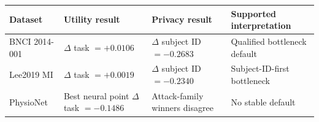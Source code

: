 \begin{tabular}{llll}
\toprule
Dataset & Utility result & Privacy result & Supported interpretation \\
\midrule
BNCI 2014-001 & $\Delta$ task $=+0.0106$ & $\Delta$ subject ID $=-0.2683$ & Qualified bottleneck default \\
Lee2019 MI & $\Delta$ task $=+0.0019$ & $\Delta$ subject ID $=-0.2340$ & Subject-ID-first bottleneck \\
PhysioNet & Best neural point $\Delta$ task $=-0.1486$ & Attack-family winners disagree & No stable default \\
\bottomrule
\end{tabular}
